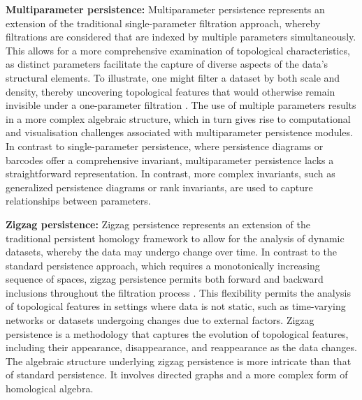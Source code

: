 \textbf{Multiparameter persistence:} Multiparameter persistence represents an extension of the traditional single-parameter filtration approach, whereby filtrations are considered that are indexed by multiple parameters simultaneously. This allows for a more comprehensive examination of topological characteristics, as distinct parameters facilitate the capture of diverse aspects of the data's structural elements. To illustrate, one might filter a dataset by both scale and density, thereby uncovering topological features that would otherwise remain invisible under a one-parameter filtration \cite{CarlssonZomorodian2009}. The use of multiple parameters results in a more complex algebraic structure, which in turn gives rise to computational and visualisation challenges associated with multiparameter persistence modules. In contrast to single-parameter persistence, where persistence diagrams or barcodes offer a comprehensive invariant, multiparameter persistence lacks a straightforward representation. In contrast, more complex invariants, such as generalized persistence diagrams or rank invariants, are used to capture relationships between parameters.

\textbf{Zigzag persistence:} Zigzag persistence represents an extension of the traditional persistent homology framework to allow for the analysis of dynamic datasets, whereby the data may undergo change over time. In contrast to the standard persistence approach, which requires a monotonically increasing sequence of spaces, zigzag persistence permits both forward and backward inclusions throughout the filtration process \cite{Carlsson2010}. This flexibility permits the analysis of topological features in settings where data is not static, such as time-varying networks or datasets undergoing changes due to external factors. Zigzag persistence is a methodology that captures the evolution of topological features, including their appearance, disappearance, and reappearance as the data changes. The algebraic structure underlying zigzag persistence is more intricate than that of standard persistence. It involves directed graphs and a more complex form of homological algebra.

